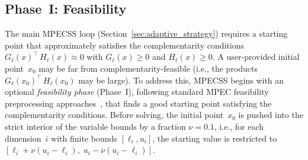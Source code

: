 \subsection{Phase~I: Feasibility}
\label{sec:feasibility}

The main MPECSS loop (Section~\ref{sec:adaptive_strategy}) requires a starting point that approximately satisfies the complementarity conditions $G_\ell(x)^{\top}\, H_\ell(x) \approx 0$ with $G_\ell(x) \geq 0$ and $H_\ell(x) \geq 0$. A user-provided initial point~$x_0$ may be far from complementarity-feasible (i.e., the products $G_\ell(x_0)^{\top}\, H_\ell(x_0)$ may be large). To address this, MPECSS begins with an optional \emph{feasibility phase} (Phase~I), following standard MPEC feasibility preprocessing approaches~\cite{BaumruckerBiegler2008,NurkanovicLeyffer2025}, that finds a good starting point satisfying the complementarity conditions. Before solving, the initial point~$x_0$ is pushed into the strict interior of the variable bounds by a fraction $\nu = 0.1$, i.e., for each dimension~$i$ with finite bounds $[\ell_i, u_i]$, the starting value is restricted to $[\ell_i + \nu(u_i - \ell_i),\; u_i - \nu(u_i - \ell_i)]$. 

